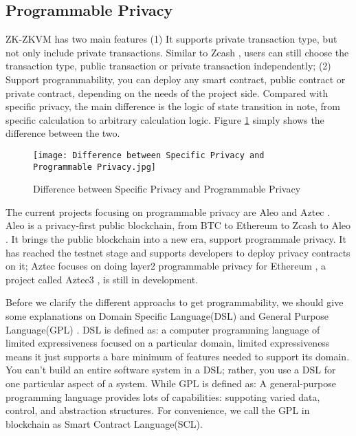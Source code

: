 \subsection{Programmable Privacy}

ZK-ZKVM has two main features (1) It supports private transaction type, but not only include private transactions. Similar to Zcash \cite{website:Zcash}, users can still 
choose the transaction type, public transaction or private transaction independently; 
(2) Support programmability, you can deploy any smart contract, public contract or 
private contract, depending on the needs of the project side. Compared with specific 
privacy, the main difference is the logic of state transition in note, from specific 
calculation to arbitrary calculation logic. Figure \ref{fig:Difference between Specific Privacy and Programmable Privacy} simply shows the difference 
between the two.
\begin{figure}[!ht]
    \centering
    \texttt{[image: Difference between Specific Privacy and Programmable Privacy.jpg]}
    \caption{Difference between Specific Privacy and Programmable Privacy}
    \label{fig:Difference between Specific Privacy and Programmable Privacy}
\end{figure}

The current projects focusing on programmable privacy are Aleo \cite{website:Aleo} and Aztec \cite{website:Aztec}. Aleo \cite{website:Aleo} is a 
privacy-first public blockchain, from BTC \cite{website:BTC} to Ethereum \cite{website:Ethereum} to Zcash \cite{website:Zcash} to Aleo \cite{website:Aleo}. It brings the public blockchain into a new era,
support programmale privacy. 
It has reached the testnet stage and supports developers to deploy privacy contracts on it; 
Aztec \cite{website:Aztec} focuses on doing layer2 programmable privacy for Ethereum \cite{website:Ethereum} , a project 
called Aztec3 \cite{website:Aztec3}, is still in development.

Before we clarify the different approachs to get programmability, we should give some explanations on Domain Specific Language(DSL)  \cite{website:DSL} and General Purpose Language(GPL)  \cite{website:DSL}.
DSL \cite{website:DSL} is defined as: a computer programming language of limited expressiveness focused on a particular domain, limited expressiveness means it just supports a bare minimum of features 
needed to support its domain. You can't build an entire software system in a DSL; rather, you use a DSL \cite{website:DSL} for one particular aspect of a system. While GPL \cite{website:DSL} is defined as: A general-purpose programming language
provides lots of capabilities: suppoting varied data, control, and abstraction structures. For convenience, we call the GPL in blockchain as Smart Contract Language(SCL).

